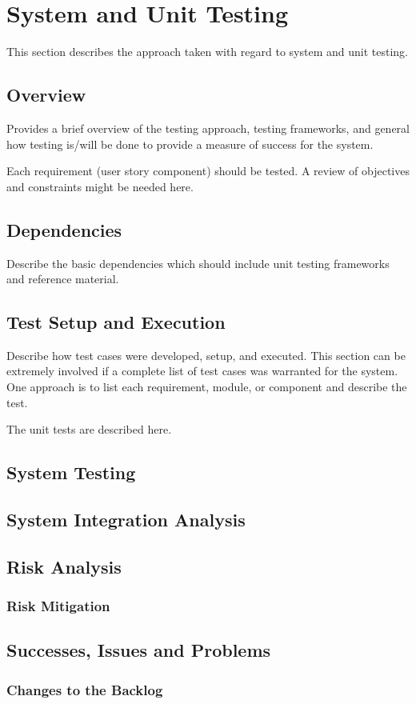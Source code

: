 

\chapter{System  and Unit Testing}

This section describes the approach taken with regard to system and unit testing. 

\section{Overview}
Provides a brief overview of the testing approach, testing frameworks, and general 
how testing is/will be done to provide a measure of success for the system. 

Each requirement (user story component) should be tested.    A review of objectives and
constraints might be needed here.  

\section{Dependencies}
Describe the basic dependencies which should include unit testing frameworks and 
reference material. 


\section{Test Setup and Execution}
Describe how test cases were developed, setup, and executed.  This section can 
be extremely involved if a complete list of test cases was warranted for the system.   One 
approach is to list each requirement, module, or component and describe the test.

The unit tests are described here.

\section{System Testing}

\section{System Integration Analysis}

\section{Risk Analysis}

\subsection{Risk Mitigation}

\section{Successes, Issues and Problems}

\subsection{Changes to the Backlog}

